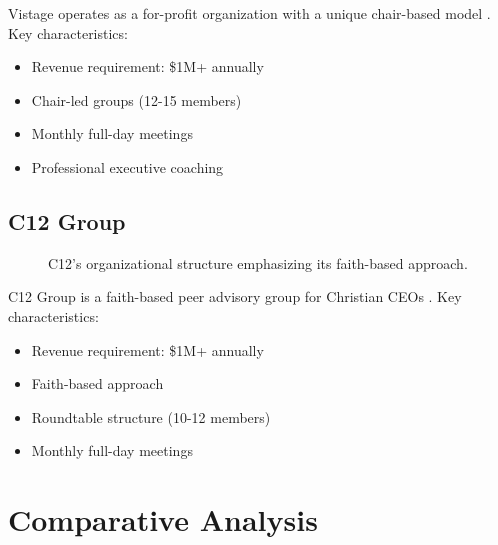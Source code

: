 \documentclass[conference]{IEEEtran}
\begin{document}
Vistage operates as a for-profit organization with a unique chair-based model \cite{crews2020executive}. Key characteristics:
\begin{itemize}
\item Revenue requirement: \$1M+ annually
\item Chair-led groups (12-15 members)
\item Monthly full-day meetings
\item Professional executive coaching
\end{itemize}

\subsection{C12 Group}
\begin{figure}[t]
\centering
{}
\caption{C12's organizational structure emphasizing its faith-based approach.}
\label{fig:c12_structure}
\end{figure}

C12 Group is a faith-based peer advisory group for Christian CEOs \cite{crews2020executive}. Key characteristics:
\begin{itemize}
\item Revenue requirement: \$1M+ annually
\item Faith-based approach
\item Roundtable structure (10-12 members)
\item Monthly full-day meetings
\end{itemize}

\section{Comparative Analysis}
\end{document}
